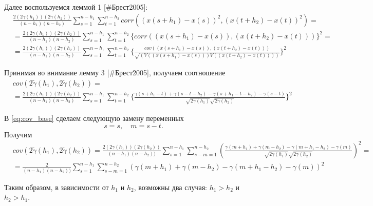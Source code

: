 \documentclass[a4paper]{article}
\begin{document}
Далее воспользуемся леммой 1 [\#Брест2005]:
\begin{eqnarray*}
	& \frac{2 (2\gamma(h_1))(2\gamma(h_2))}{(n-h_1)(n-h_2)}\sum_{s=1}^{n-h_1}\sum_{t=1}^{n-h_2} corr((x(s+h_1) - x(s))^2, (x(t+h_2) - x(t))^2) = \\
	& = \frac{2 (2\gamma(h_1))(2\gamma(h_2))}{(n-h_1)(n-h_2)}\sum_{s=1}^{n-h_1}\sum_{t=1}^{n-h_2} \{corr((x(s+h_1) - x(s)), (x(t+h_2) - x(t))) \}^2 = \\
	& = \frac{2 (2\gamma(h_1))(2\gamma(h_2))}{(n-h_1)(n-h_2)}\sum_{s=1}^{n-h_1}\sum_{t=1}^{n-h_2} \{\frac{cov((x(s+h_1) - x(s)), (x(t+h_2) - x(t)))}{\sqrt{(V((x(s+h_1) - x(s))) V((x(t+h_2) - x(t))))}} \}^2
\end{eqnarray*}

Принимая во внимание лемму 3 [\#Брест2005], получаем соотношение
\begin{eqnarray}
\nonumber
\label{eq:cov_base}
	& cov(2 \tilde{\gamma}(h_1), 2 \tilde{\gamma}(h_2)) = \\
	& = \frac{2 (2\gamma(h_1))(2\gamma(h_2))}{(n-h_1)(n-h_2)}\sum_{s=1}^{n-h_1}\sum_{t=1}^{n-h_2} \{\frac{\gamma(s+h_1-t) + \gamma(s-t-h_2) - \gamma(s+h_1-t-h_2) - \gamma(s-t)}{\sqrt{2 \gamma(h_1)} \sqrt{2 \gamma(h_2)}} \}^2
\end{eqnarray}

В \eqref{eq:cov_base} сделаем следующую замену переменных
\begin{equation*}
	s = s, \quad m = s - t.
\end{equation*}
Получим
\begin{eqnarray}
\nonumber
\label{eq:cov_split}
	& cov(2 \tilde{\gamma}(h_1), 2 \tilde{\gamma}(h_2)) = \frac{2(2 \gamma(h_1))(2 \gamma(h_2))}{(n - h_1) (n - h_2))} \sum_{s = 1}^{n - h_1}\sum_{s - m = 1}^{n - h_2} (\frac{\gamma(m + h_1) + \gamma(m - h_2) - \gamma(m + h_1 - h_2) - \gamma(m)}{\sqrt{2 \gamma(h_1)} \sqrt{2 \gamma(h_2)}})^2 = \\
	& = \frac{2}{(n - h_1) (n - h_2))} \sum_{s = 1}^{n - h_1}\sum_{s - m = 1}^{n - h_2} (\gamma(m + h_1) + \gamma(m - h_2) - \gamma(m + h_1 - h_2) - \gamma(m))^2
\end{eqnarray}

Таким образом, в зависимости от $h_1$ и $h_2$, возможны два случая: $h_1 > h_2$ и $h_2 > h_1$.
\end{document}
